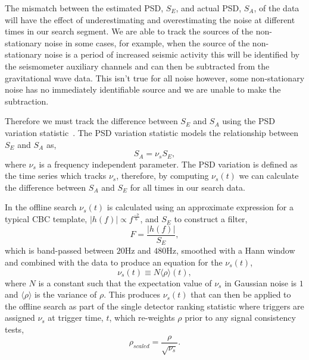 The mismatch between the estimated PSD, $S_{E}$, and actual PSD, $S_{A}$, of the data will have the effect of underestimating and overestimating the noise at different times in our search segment. We are able to track the sources of the non-stationary noise in some cases, for example, when the source of the non-stationary noise is a period of increased seismic activity this will be identified by the seismometer auxiliary channels and can then be subtracted from the gravitational wave data. This isn't true for all noise however, some non-stationary noise has no immediately identifiable source and we are unable to make the subtraction.

Therefore we must track the difference between $S_{E}$ and $S_{A}$ using the PSD variation statistic~\cite{PSD_var:2020}. The PSD variation statistic models the relationship between $S_{E}$ and $S_{A}$ as,
%
\begin{equation}
    S_{A} = \nu_{s} S_{E}, 
\end{equation}
%
where $\nu_{s}$ is a frequency independent parameter. The PSD variation is defined as the time series which tracks $\nu_{s}$, therefore, by computing $\nu_{s}(t)$ we can calculate the difference between $S_{A}$ and $S_{E}$ for all times in our search data.

In the offline search $\nu_{s}(t)$ is calculated using an approximate expression for a typical CBC template, $|h(f)| \propto f^{\frac{-7}{6}}$, and $S_{E}$ to construct a filter,
%
\begin{equation}
    F = \frac{|h(f)|}{S_{E}} ,
    \label{5:eqn:psd-var-filter}
\end{equation}
%
which is band-passed between $20$Hz and $480$Hz, smoothed with a Hann window and combined with the data to produce an equation for the $\nu_{s}(t)$,
%
\begin{equation}
    \nu_{s}(t) \equiv N \langle \rho \rangle(t), 
\end{equation}
%
where $N$ is a constant such that the expectation value of $\nu_{s}$ in Gaussian noise is $1$ and $\langle\rho\rangle$ is the variance of $\rho$. This produces $\nu_{s}(t)$ that can then be applied to the offline search as part of the single detector ranking statistic where triggers are assigned $\nu_{s}$ at trigger time, $t$, which re-weights $\rho$ prior to any signal consistency tests,
%
\begin{equation}
    \rho_{scaled} = \frac{\rho}{\sqrt{\nu_{s}}} .
    \label{5:eqn:psd-var-snr-reweighting}
\end{equation}

